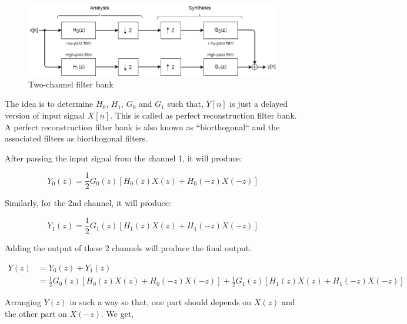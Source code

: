  
 
 \begin{figure}
 	\centering
 	\includegraphics[width=160mm]{images/2_channel_filter_bank}
 	\caption{Two-channel filter bank}
 	\label{fig:2_channel_filter_bank}
 \end{figure}
 
 
 
 The idea is to determine $H_0$, $H_1$, $G_0$ and $G_1$ such that, $Y[n]$ is just a delayed version of input signal $X[n]$. This is called as perfect reconstruction filter bank. A perfect reconstruction filter bank is also known as ``biorthogonal`` and the associated filters as biorthogonal filters. 

After passing the input signal from the channel 1, it will produce:

\begin{equation} \label{eqn_wavelet_transform}
{Y_{0}(z) = \frac{1}{2}G_{0}(z)[H_{0}(z)X(z) + H_{0}(-z)X(-z)]}
\end{equation}

Similarly, for the 2nd channel, it will produce:


\begin{equation} \label{eqn_wavelet_transform}
{Y_{1}(z) = \frac{1}{2}G_{1}(z)[H_{1}(z)X(z) + H_{1}(-z)X(-z)]}
\end{equation}

Adding the output of these 2 channels will produce the final output.



\begin{equation} \label{eq1}
	\begin{split}
Y(z)  &= Y_{0}(z) + Y_{1}(z) \\
 &= \frac{1}{2}G_{0}(z)[H_{0}(z)X(z) + H_{0}(-z)X(-z)] + \frac{1}{2}G_{1}(z)[H_{1}(z)X(z) + H_{1}(-z)X(-z)]
	\end{split}
\end{equation}


Arranging $Y(z)$ in such a way so that, one part should depends on $X(z)$ and the other part on $X(-z)$. We get,

